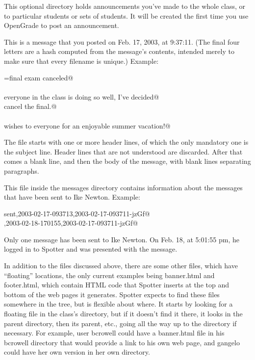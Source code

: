 \documentclass{doc}
\begin{document}
This optional directory holds announcements you've made to the whole class, or to particular
students or sets of students. It will be created the first time you use OpenGrade to post
an announcement.

 This is a message that you posted on Feb. 17, 2003, at 9:37:11.
(The final four letters are a hash computed from the message's contents, intended merely to
make sure that every filename is unique.)
Example:

\verb@subject=final exam canceled@\\
\verb@@\\
\verb@Since everyone in the class is doing so well, I've decided@\\
\verb@to cancel the final.@\\
\verb@@\\
\verb@Best wishes to everyone for an enjoyable summer vacation!@

The file starts with one or more header lines, of which the only mandatory one is
the subject line. Header lines that are not understood are discarded. After that
comes a blank line, and then the body of the message, with blank lines separating
paragraphs.

 This file inside the messages directory contains information about
the messages that have been sent to Ike Newton. Example:

\verb@    sent,2003-02-17-093713,2003-02-17-093711-jzGf@\\
\verb@received,2003-02-18-170155,2003-02-17-093711-jzGf@

Only one message has been sent to Ike Newton. On Feb. 18, at 5:01:55 pm, he logged in
to Spotter and was presented with the message.

In addition to the files discussed above, there are some other files, which
have ``floating'' locations, the only current examples being banner.html and footer.html, which contain
HTML code that Spotter inserts at the top and bottom of the web pages it generates. Spotter
expects to find these files somewhere in the tree, but is flexible about where. It starts by looking 
for a floating file in the class's
directory, but if it doesn't find it there, it looks in the parent directory, then its parent, etc., going all the way
up to the \verb@spotter@ directory if necessary. For example, user bcrowell could have a banner.html file
in his bcrowell directory that would provide a link to his own web page, and gangelo could have her
own version in her own directory.
\end{document}
